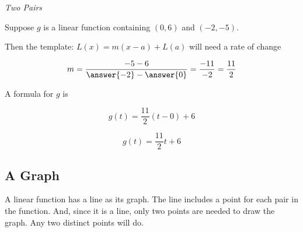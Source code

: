 \documentclass{ximera}
\begin{document}
\begin{example} \textit{Two Pairs}


Suppose $g$ is a linear function containing $(0, 6)$ and $(-2, -5)$.

Then the template: $L(x) = m (x-a) + L(a)$ will need a rate of change



\[  m = \frac{-5 - 6}{\answer{-2} - \answer{0}} = \frac{-11}{-2} = \frac{11}{2}  \]

A formula for $g$ is


\[  g(t) = \frac{11}{2} (t-0) + 6     \]


\[  g(t) = \frac{11}{2} t + 6    \]



\end{example}










\subsection*{A Graph}




A linear function has a line as its graph.  The line includes a point for each pair in the function.  And, since it is a line, only two points are needed to draw the graph.  Any two distinct points will do.
\end{document}
